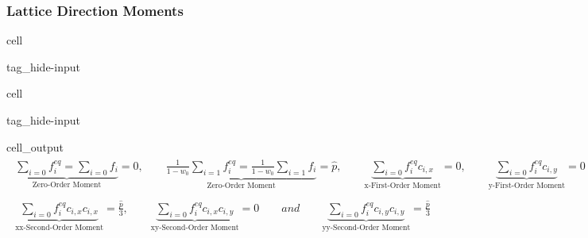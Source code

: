 \documentclass[letterpaper,10pt,english,openany,oneside]{jupyterBook}
\begin{document}
\subsubsection{Lattice Direction Moments}
\label{\detokenize{LBM-Study/Poisson-Equation:lattice-direction-moments}}
\begin{sphinxuseclass}{cell}
\begin{sphinxuseclass}{tag_hide-input}
\end{sphinxuseclass}
\end{sphinxuseclass}
\begin{sphinxuseclass}{cell}
\begin{sphinxuseclass}{tag_hide-input}\begin{sphinxVerbatimOutput}

\begin{sphinxuseclass}{cell_output}\begin{equation*}
\begin{split}\displaystyle \begin{gathered}\underbrace{\sum_{i=0} f_{i}^{eq} =\sum_{i=0} f_{i} }_{\textrm{Zero-Order Moment}} =0,\quad \quad \underbrace{\frac{1}{1-w_{0}}\sum_{i=1} f_{i}^{eq} = \frac{1}{1-w_{0}}\sum_{i=1} f_{i} }_{\textrm{Zero-Order Moment}} =\widehat{p},\quad \quad \underbrace{\sum_{i=0} f_{i}^{eq}c_{i,x} }_{\textrm{x-First-Order Moment}} =0,\quad \quad \underbrace{\sum_{i=0} f_{i}^{eq}c_{i,y} }_{\textrm{y-First-Order Moment}} =0\end{gathered}\end{split}
\end{equation*}\begin{equation*}
\begin{split}\displaystyle \begin{gathered}\underbrace{\sum_{i=0} f_{i}^{eq}c_{i,x}c_{i,x} }_{\textrm{xx-Second-Order Moment}} =\frac{\widehat{p}}{3},\quad \quad \underbrace{\sum_{i=0} f_{i}^{eq}c_{i,x}c_{i,y} }_{\textrm{xy-Second-Order Moment}} =0 \quad \quad and \quad \quad \underbrace{\sum_{i=0} f_{i}^{eq}c_{i,y}c_{i,y} }_{\textrm{yy-Second-Order Moment}} =\frac{\widehat{p}}{3}\end{gathered}\end{split}
\end{equation*}
\end{sphinxuseclass}\end{sphinxVerbatimOutput}

\end{sphinxuseclass}
\end{sphinxuseclass}
\end{document}
